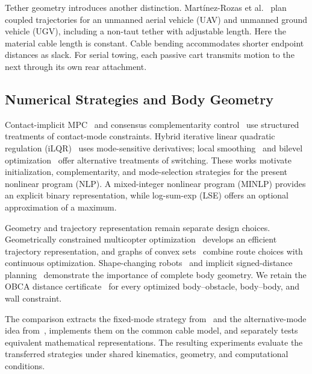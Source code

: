 Tether geometry introduces another distinction. Mart\'inez-Rozas et al.~\cite{marsupial2023} plan coupled trajectories for an unmanned aerial vehicle (UAV) and unmanned ground vehicle (UGV), including a non-taut tether with adjustable length. Here the material cable length is constant. Cable bending accommodates shorter endpoint distances as slack. For serial towing, each passive cart transmits motion to the next through its own rear attachment.

\subsection{Numerical Strategies and Body Geometry}
Contact-implicit MPC~\cite{cleach2024} and consensus complementarity control~\cite{aydinoglu2024} use structured treatments of contact-mode constraints. Hybrid iterative linear quadratic regulation (iLQR)~\cite{kong2023} uses mode-sensitive derivatives; local smoothing~\cite{pang2023} and bilevel optimization~\cite{shirai2024} offer alternative treatments of switching. These works motivate initialization, complementarity, and mode-selection strategies for the present nonlinear program (NLP). A mixed-integer nonlinear program (MINLP) provides an explicit binary representation, while log-sum-exp (LSE) offers an optional approximation of a maximum.

Geometry and trajectory representation remain separate design choices. Geometrically constrained multicopter optimization~\cite{wang2022minco} develops an efficient trajectory representation, and graphs of convex sets~\cite{kurtz2023} combine route choices with continuous optimization. Shape-changing robots~\cite{shape2023} and implicit signed-distance planning~\cite{anyshape2023} demonstrate the importance of complete body geometry. We retain the OBCA distance certificate~\cite{obca2021} for every optimized body--obstacle, body--body, and wall constraint.

The comparison extracts the fixed-mode strategy from~\cite{zhang2026} and the alternative-mode idea from~\cite{yang2022}, implements them on the common cable model, and separately tests equivalent mathematical representations. The resulting experiments evaluate the transferred strategies under shared kinematics, geometry, and computational conditions.
